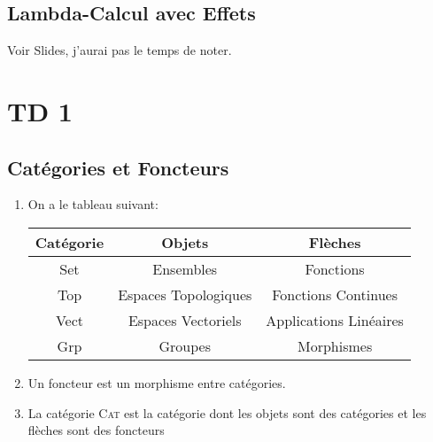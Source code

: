 \documentclass[math, info]{cours}
\begin{document}
\subsection{Lambda-Calcul avec Effets}
Voir Slides, j'aurai pas le temps de noter.

\section{TD 1}
\subsection{Catégories et Foncteurs}
\begin{enumerate}
	\item On a le tableau suivant:
	      \begin{tabular}{>{\sc}ccc}
		      \bf Catégorie & \bf Objets           & \bf Flèches            \\
		      \midrule
		      Set           & Ensembles            & Fonctions              \\
		      Top           & Espaces Topologiques & Fonctions Continues    \\
		      Vect          & Espaces Vectoriels   & Applications Linéaires \\
		      Grp           & Groupes              & Morphismes
	      \end{tabular}
	\item Un foncteur est un morphisme entre catégories.
	\item La catégorie \textsc{Cat} est la catégorie dont les objets sont des catégories et les flèches sont des foncteurs
\end{enumerate}
\end{document}
